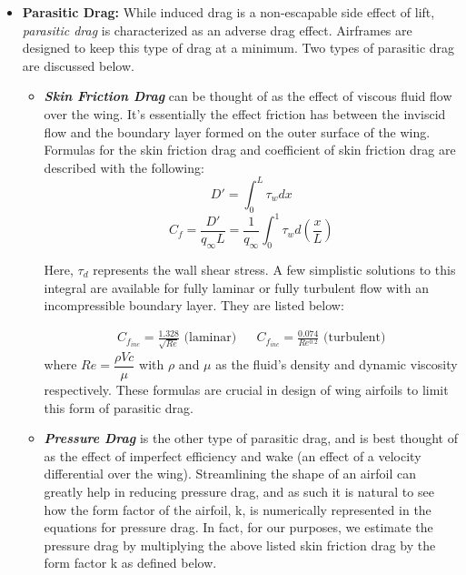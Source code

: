 \documentclass{report}
\begin{document}
\begin{itemize}
\begin{itemize}
            \item \textbf{Parasitic Drag:} While induced drag is a non-escapable side effect of lift, \textit{parasitic drag}
            is characterized as an adverse drag effect. Airframes are designed to keep this type of drag at a minimum. Two
            types of parasitic drag are discussed below.
            
                \begin{itemize}
                    \item \textbf{\textit{Skin Friction Drag}} can be thought of as the effect of viscous fluid flow
                    over the wing. It's essentially the effect friction has between the inviscid flow and the boundary layer formed on
                    the outer surface of the wing. Formulas for the skin friction drag and coefficient of skin friction drag are described with the following:
                    \begin{equation}
                    D' = \int_{0}^{L} \tau_w dx
                    \end{equation}
                    \begin{equation}
                    C_f = \frac{D'}{q_{\infty}L} = \frac{1}{q_{\infty}} \int_{0}^{1} \tau_w d \left(\frac{x}{L}\right)
                    \end{equation}

                    Here, $\tau_d$ represents the wall shear stress. A few simplistic solutions to this integral are
                    available for fully laminar or fully turbulent flow with an incompressible boundary layer. They are listed below:

                    \begin{align*}
                    C_{f_{inc}} = \frac{1.328}{\sqrt{Re}} \text{ (laminar)} && C_{f_{inc}} = \frac{0.074}{Re^{0.2}} \text{ (turbulent)}
                    \end{align*}
                    where $Re = \dfrac{\rho V c}{\mu}$ with $\rho$ and $\mu$ as the fluid's density and dynamic viscosity respectively.
                    These formulas are crucial in design of wing airfoils to limit this form of parasitic drag.
                    
                    \item \textbf{\textit{Pressure Drag}} is the other type of parasitic drag, and is best thought of as the effect of
                    imperfect efficiency and wake (an effect of a velocity differential over the wing). Streamlining the shape of an airfoil
                    can greatly help in reducing pressure drag, and as such it is natural to see how the form factor of the airfoil, k, is
                    numerically represented in the equations for pressure drag. In fact, for our purposes, we estimate the pressure drag by 
                    multiplying the above listed skin friction drag by the form factor k as defined below.
                    

\end{itemize}
\end{itemize}
\end{itemize}
\end{document}
